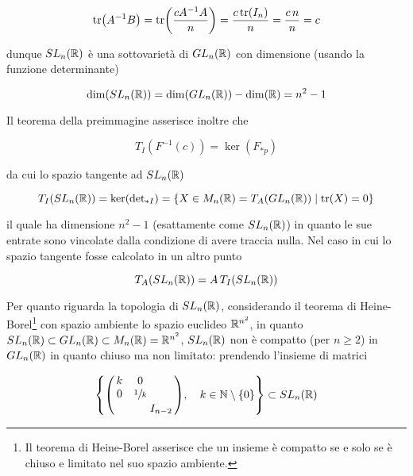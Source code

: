 \begin{equation}
	\tr(A^{-1} B) = \tr(\dfrac{c A^{-1} A}{n}) = \dfrac{c \tr(I_{n})}{n} = \dfrac{c \, n}{n} = c
\end{equation}

dunque $ SL_{n}(\mathbb{R}) $ è una sottovarietà di $ GL_{n}(\mathbb{R}) $ con dimensione (usando la funzione determinante)

\begin{equation}
	\dim(SL_{n}(\mathbb{R})) = \dim(GL_{n}(\mathbb{R})) - \dim(\mathbb{R}) = n^{2} - 1
\end{equation}

Il teorema della preimmagine asserisce inoltre che

\begin{equation}
	T_{I}(F^{-1}(c)) = \ker(F_{*p})
\end{equation}

da cui lo spazio tangente ad $ SL_{n}(\mathbb{R}) $

\begin{equation}
	T_{I}(SL_{n}(\mathbb{R})) = \ker(\operatorname{det}_{*I}) = \{ X \in M_{n}(\mathbb{R}) = T_{A}(GL_{n}(\mathbb{R})) \mid \tr(X) = 0 \}
\end{equation}

il quale ha dimensione $ n^{2} - 1 $ (esattamente come $ SL_{n}(\mathbb{R}) $) in quanto le sue entrate sono vincolate dalla condizione di avere traccia nulla. Nel caso in cui lo spazio tangente fosse calcolato in un altro punto

\begin{equation}
	T_{A}(SL_{n}(\mathbb{R})) = A \, T_{I}(SL_{n}(\mathbb{R}))
\end{equation}

Per quanto riguarda la topologia di $ SL_{n}(\mathbb{R}) $, considerando il teorema di Heine-Borel\footnote{%
	Il teorema di Heine-Borel asserisce che un insieme è compatto se e solo se è chiuso e limitato nel suo spazio ambiente.%
} con spazio ambiente lo spazio euclideo $ \mathbb{R}^{n^{2}} $, in quanto $ SL_{n}(\mathbb{R}) \subset GL_{n}(\mathbb{R}) \subset M_{n}(\mathbb{R}) = \mathbb{R}^{n^{2}} $, $ SL_{n}(\mathbb{R}) $ non è compatto (per $ n \geqslant 2 $) in $ GL_{n}(\mathbb{R}) $ in quanto chiuso ma non limitato: prendendo l'insieme di matrici

\begin{equation}
	\left\{ %
		\smqty(\dmat{ k & 0 \\ 0 & \sfrac{1}{k}, I_{n-2} }) \qcomma k \in \N \setminus \{0\}
	\right\} %
	\subset SL_{n}(\R)
\end{equation}

